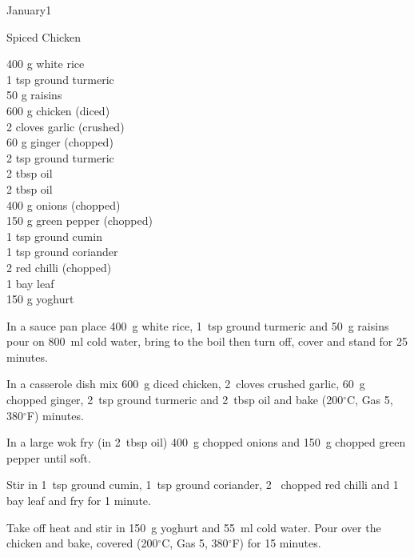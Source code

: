 \begin{menu}{January1}
    \begin{recipe}{2}{Spiced Chicken}%
		\begin{ingredients}
		400 g white rice  \\
	1 tsp ground turmeric  \\
	50 g raisins  \\
	600 g chicken (diced) \\
	2 cloves garlic (crushed) \\
	60 g ginger (chopped) \\
	2 tsp ground turmeric  \\
	2 tbsp oil  \\
	2 tbsp oil  \\
	400 g onions (chopped) \\
	150 g green pepper (chopped) \\
	1 tsp ground cumin  \\
	1 tsp ground coriander  \\
	2  red chilli (chopped) \\
	1  bay leaf  \\
	150 g yoghurt  \\
	
		\end{ingredients}
	
	
    \begin{instructions}
    \item 
    In a
    sauce pan
    place
    400~g  white rice,
    1~tsp  ground turmeric
    and
    50~g  raisins
    pour on
    800~ml  cold water,
    bring to the boil then turn off, cover and stand for 25 minutes.
  \item 
        In a casserole dish mix
        600~g diced chicken,
        2~cloves crushed garlic,
        60~g chopped ginger,
        2~tsp  ground turmeric and
        2~tbsp  oil
        and
        bake (200$^{\circ}$C, Gas 5, 380$^{\circ}$F) minutes.
      \item 
        In a large wok fry
        (in 2~tbsp  oil)
        400~g chopped onions
        and
        150~g chopped green pepper
        until soft.
      \item 
        Stir in
        1~tsp  ground cumin,
        1~tsp  ground coriander,
        2~ chopped red chilli
        and
        1~  bay leaf
        and fry for 1 minute.
      \item 
        Take off heat
        and
        stir in
        150~g  yoghurt
        and
        55~ml  cold water.
        Pour over the chicken
        and bake,
        covered (200$^{\circ}$C, Gas 5, 380$^{\circ}$F) for 15 minutes.
      

\end{instructions}
\end{recipe}
\end{menu}
